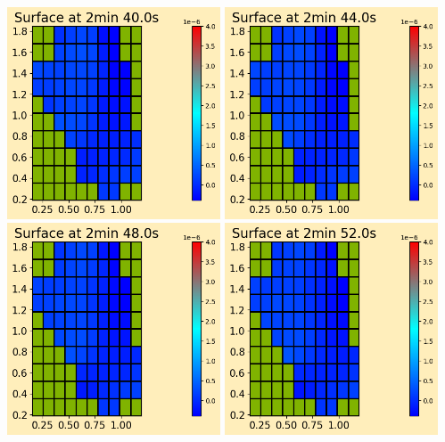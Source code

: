 \documentclass[11pt]{article}
\begin{document}
\vskip 10pt 
\includegraphics[width=0.475\textwidth]{frame0040fig0.png}
\vskip 10pt 
\includegraphics[width=0.475\textwidth]{frame0041fig0.png}
\vskip 10pt 
\includegraphics[width=0.475\textwidth]{frame0042fig0.png}
\vskip 10pt 
\includegraphics[width=0.475\textwidth]{frame0043fig0.png}
\end{document}
